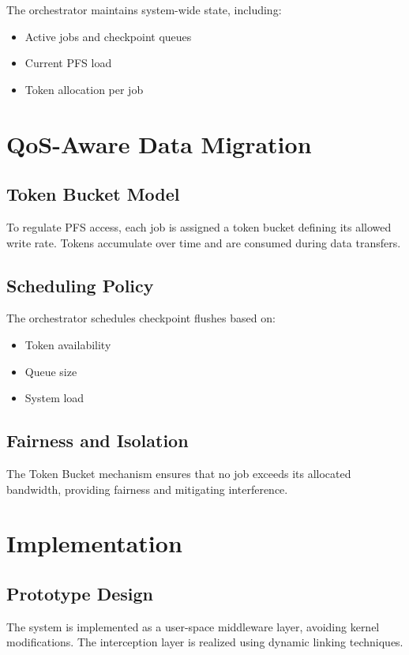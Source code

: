 \documentclass[conference,a4paper]{IEEEtran}
\begin{document}
The orchestrator maintains system-wide state, including:
\begin{itemize}
    \item Active jobs and checkpoint queues
    \item Current PFS load
    \item Token allocation per job
\end{itemize}

\section{QoS-Aware Data Migration}

\subsection{Token Bucket Model}

To regulate PFS access, each job is assigned a token bucket defining its allowed write rate. Tokens accumulate over time and are consumed during data transfers.

\subsection{Scheduling Policy}

The orchestrator schedules checkpoint flushes based on:
\begin{itemize}
    \item Token availability
    \item Queue size
    \item System load
\end{itemize}

\subsection{Fairness and Isolation}

The Token Bucket mechanism ensures that no job exceeds its allocated bandwidth, providing fairness and mitigating interference.

\section{Implementation}

\subsection{Prototype Design}

The system is implemented as a user-space middleware layer, avoiding kernel modifications. The interception layer is realized using dynamic linking techniques.
\end{document}
